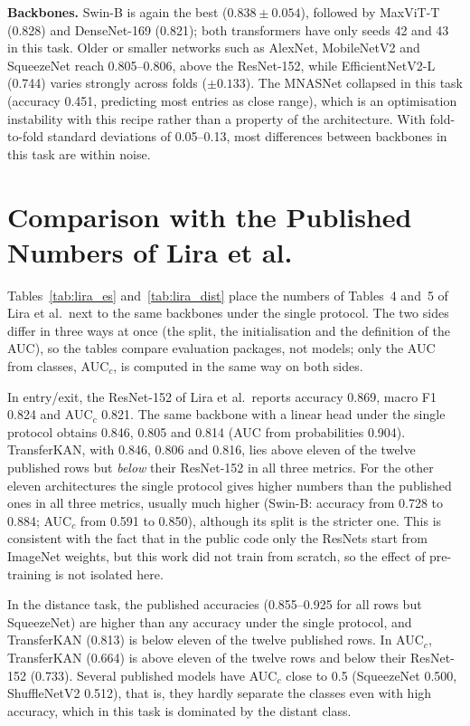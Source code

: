 \textbf{Backbones.} Swin-B is again the best ($0.838 \pm 0.054$), followed by MaxViT-T (0.828) and DenseNet-169 (0.821); both transformers have only seeds 42 and 43 in this task. Older or smaller networks such as AlexNet, MobileNetV2 and SqueezeNet reach 0.805--0.806, above the ResNet-152, while EfficientNetV2-L (0.744) varies strongly across folds ($\pm 0.133$). The MNASNet collapsed in this task (accuracy 0.451, predicting most entries as close range), which is an optimisation instability with this recipe rather than a property of the architecture. With fold-to-fold standard deviations of 0.05--0.13, most differences between backbones in this task are within noise.

\section{Comparison with the Published Numbers of Lira et al.}
\label{sec:res_lira}

Tables~\ref{tab:lira_es} and~\ref{tab:lira_dist} place the numbers of Tables~4 and~5 of Lira et al.\ next to the same backbones under the single protocol. The two sides differ in three ways at once (the split, the initialisation and the definition of the AUC), so the tables compare evaluation packages, not models; only the AUC from classes, AUC$_c$, is computed in the same way on both sides.



In entry/exit, the ResNet-152 of Lira et al.\ reports accuracy 0.869, macro F1 0.824 and AUC$_c$ 0.821. The same backbone with a linear head under the single protocol obtains 0.846, 0.805 and 0.814 (AUC from probabilities 0.904). TransferKAN, with 0.846, 0.806 and 0.816, lies above eleven of the twelve published rows but \emph{below} their ResNet-152 in all three metrics. For the other eleven architectures the single protocol gives higher numbers than the published ones in all three metrics, usually much higher (Swin-B: accuracy from 0.728 to 0.884; AUC$_c$ from 0.591 to 0.850), although its split is the stricter one. This is consistent with the fact that in the public code only the ResNets start from ImageNet weights, but this work did not train from scratch, so the effect of pre-training is not isolated here.



In the distance task, the published accuracies (0.855--0.925 for all rows but SqueezeNet) are higher than any accuracy under the single protocol, and TransferKAN (0.813) is below eleven of the twelve published rows. In AUC$_c$, TransferKAN (0.664) is above eleven of the twelve rows and below their ResNet-152 (0.733). Several published models have AUC$_c$ close to 0.5 (SqueezeNet 0.500, ShuffleNetV2 0.512), that is, they hardly separate the classes even with high accuracy, which in this task is dominated by the distant class.


